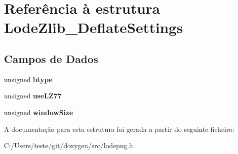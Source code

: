 \hypertarget{struct_lode_zlib___deflate_settings}{\section{Referência à estrutura Lode\-Zlib\-\_\-\-Deflate\-Settings}
\label{struct_lode_zlib___deflate_settings}
}
\subsection*{Campos de Dados}
\begin{DoxyCompactItemize}
\item 
\hypertarget{struct_lode_zlib___deflate_settings_abf13567b374a52521724a0f8bb185998}{unsigned {\bfseries btype}}\label{struct_lode_zlib___deflate_settings_abf13567b374a52521724a0f8bb185998}

\item 
\hypertarget{struct_lode_zlib___deflate_settings_a43b60eff0e884eac68a660d4c2fba346}{unsigned {\bfseries use\-L\-Z77}}\label{struct_lode_zlib___deflate_settings_a43b60eff0e884eac68a660d4c2fba346}

\item 
\hypertarget{struct_lode_zlib___deflate_settings_a4492a486c4b23b57fad9a45cab046028}{unsigned {\bfseries window\-Size}}\label{struct_lode_zlib___deflate_settings_a4492a486c4b23b57fad9a45cab046028}

\end{DoxyCompactItemize}


A documentação para esta estrutura foi gerada a partir do seguinte ficheiro\-:\begin{DoxyCompactItemize}
\item 
C\-:/\-Users/teste/git/doxygen/src/lodepng.\-h\end{DoxyCompactItemize}
